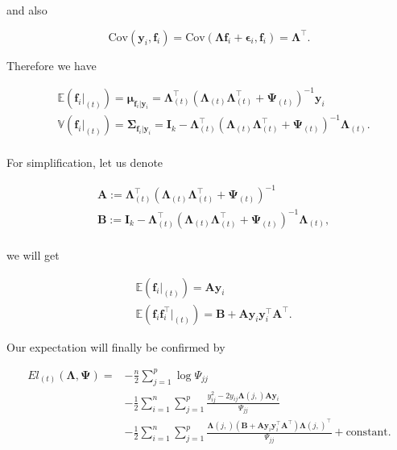 \documentclass[
  a4paper,
  oneside,
  openany,
  12pt,
  onecolumn,
  twoside]{book}
\theoremstyle{plain}
\theoremstyle{remark}
\begin{document}
and also

\[
\text{Cov}(\boldsymbol{y}_i,\boldsymbol{f}_i)=\text{Cov}(\boldsymbol{\Lambda f}_i+\boldsymbol{\epsilon}_i,\boldsymbol{f}_i)=\boldsymbol{\Lambda}^\top.
\]

Therefore we have

\[
\begin{align*}
&\mathbb{E}(\boldsymbol{f}_i|_{(t)})=\boldsymbol{\mu}_{\boldsymbol{f}_i|\boldsymbol{y}_i}=\boldsymbol{\Lambda}_{(t)}^\top(\boldsymbol{\Lambda}_{(t)}\boldsymbol{\Lambda}_{(t)}^\top+\boldsymbol{\Psi}_{(t)})^{-1}\boldsymbol{y}_i\\
&\mathbb{V}(\boldsymbol{f}_i|_{(t)})=\boldsymbol{\Sigma}_{\boldsymbol{f}_i|\boldsymbol{y}_i}=\boldsymbol{I}_k-\boldsymbol{\Lambda}_{(t)}^\top(\boldsymbol{\Lambda}_{(t)}\boldsymbol{\Lambda}_{(t)}^\top+\boldsymbol{\Psi}_{(t)})^{-1}\boldsymbol{\Lambda}_{(t)}.\\
\end{align*} 
\]

For simplification, let us denote

\[
\begin{align*}
&\boldsymbol{A}:=\boldsymbol{\Lambda}_{(t)}^\top(\boldsymbol{\Lambda}_{(t)}\boldsymbol{\Lambda}_{(t)}^\top+\boldsymbol{\Psi}_{(t)})^{-1}\\
&\boldsymbol{B}:=\boldsymbol{I}_k-\boldsymbol{\Lambda}_{(t)}^\top(\boldsymbol{\Lambda}_{(t)}\boldsymbol{\Lambda}_{(t)}^\top+\boldsymbol{\Psi}_{(t)})^{-1}\boldsymbol{\Lambda}_{(t)},\\
\end{align*} 
\]

we will get

\[
\begin{align*}
&\mathbb{E}(\boldsymbol{f}_i|_{(t)})= \boldsymbol{A}\boldsymbol{y}_i\\
&\mathbb{E}(\boldsymbol{f}_i\boldsymbol{f}_i^\top|_{(t)})= \boldsymbol{B}+\boldsymbol{A}\boldsymbol{y}_i\boldsymbol{y}_i^\top\boldsymbol{A}^\top.
\end{align*}
\]

Our expectation will finally be confirmed by

\[
\begin{align*}
El_{(t)}(\boldsymbol{\Lambda},\boldsymbol{\Psi})= & -\frac{n}{2}\sum_{j=1}^p\log{\Psi_{jj}}\\
& -\frac{1}{2}\sum_{i=1}^n\sum_{j=1}^p\frac{y_{ij}^2-2y_{ij}\boldsymbol{\Lambda}(j,)\boldsymbol{A}\boldsymbol{y}_i}{\Psi_{jj}}\\
& -\frac{1}{2}\sum_{i=1}^n\sum_{j=1}^p\frac{\boldsymbol{\Lambda}(j,)(\boldsymbol{B}+\boldsymbol{A}\boldsymbol{y}_i\boldsymbol{y}_i^\top\boldsymbol{A}^\top)\boldsymbol{\Lambda}(j,)^\top}{\Psi_{jj}}+\text{constant}.
\end{align*}
\]
\end{document}
